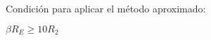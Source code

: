 \documentclass[11pt,a4paper]{article}
\begin{document}
\begin{multicols}{2}
\begin{cajita}
			\vspace{-.8cm}
		
			\begin{flushleft}
				Condición para aplicar el método aproximado:
			\end{flushleft}
				$\beta R_E \geq 10 R_2$\\
		\end{cajita}

	\end{multicols}
\end{document}
